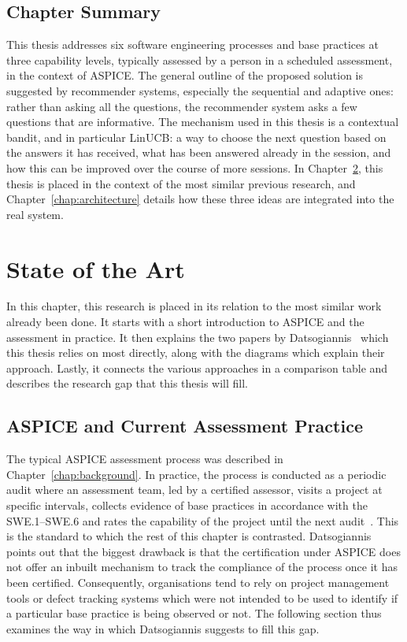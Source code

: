 \documentclass[a4paper, 12pt, oneside, openany, BCOR1cm,toc=chapterentrywithdots]{scrbook}
\begin{document}
\section{Chapter Summary}

This thesis addresses six software engineering processes and base practices at three capability
levels, typically assessed by a person in a scheduled assessment, in the context of ASPICE. The
general outline of the proposed solution is suggested by recommender systems, especially the
sequential and adaptive ones: rather than asking all the questions, the recommender system asks
a few questions that are informative. The mechanism used in this thesis is a contextual bandit,
and in particular LinUCB: a way to choose the next question based on the answers it has
received, what has been answered already in the session, and how this can be improved over the
course of more sessions. In Chapter~\ref{chap:sota}, this thesis is placed in the context of the
most similar previous research, and Chapter~\ref{chap:architecture} details how these three
ideas are integrated into the real system.

\chapter{State of the Art}
\label{chap:sota}
% 

In this chapter, this research is placed in its relation to the most similar work already been
done. It starts with a short introduction to ASPICE and the assessment in practice. It then
explains the two papers by Datsogiannis~\cite{datsogiannis2024early,datsogiannis2025recommender}
which this thesis relies on most directly, along with the
diagrams which explain their approach. Lastly, it connects the various approaches in a comparison
table and describes the research gap that this thesis will fill.

\section{ASPICE and Current Assessment Practice}

The typical ASPICE assessment process was described in Chapter~\ref{chap:background}. In
practice, the process is conducted as a periodic audit where an assessment team, led by a
certified assessor, visits a project at specific intervals, collects evidence of base practices in accordance with the
SWE.1--SWE.6 and rates the capability of the project until the next
audit~\cite{vdaqmc2023pam,murphy_aspice_0to60}. This is the standard to which the rest of this
chapter is contrasted. Datsogiannis~\cite{datsogiannis2024early} points out that the biggest
drawback is that the certification under ASPICE does not offer an inbuilt mechanism to track the
compliance of the process once it has been certified. Consequently, organisations tend to rely on
project management tools or defect tracking systems which were not intended to be used to
identify if a particular base practice is being observed or not. The following section thus
examines the way in which Datsogiannis suggests to fill this gap.
\end{document}

